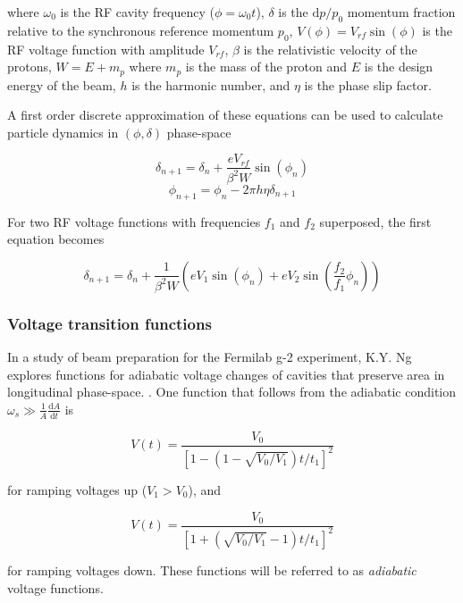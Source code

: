 where $\omega_0$ is the RF cavity frequency ($\phi = \omega_0 t$),
$\delta$ is the $\mathrm{d}p/p_0$ momentum fraction relative to the
synchronous reference momentum $p_0$, $V(\phi) = V_{rf}\sin(\phi)$ is
the RF voltage function with amplitude $V_{rf}$, $\beta$ is the
relativistic velocity of the protons, $W = E + m_p$ where $m_p$ is the
mass of the proton and $E$ is the design energy of the beam, $h$ is
the harmonic number, and $\eta$ is the phase slip factor.

A first order discrete approximation of these equations can be used to
calculate particle dynamics in $(\phi, \delta)$ phase-space

\begin{equation}
\delta_{n+1} = \delta_n +  \frac{e V_{rf}}{\beta ^2 W}\sin(\phi_n) 
\end{equation}
\begin{equation}
\phi_{n+1} = \phi_n - 2\pi h \eta \delta_{n+1} 
\end{equation}

For two RF voltage functions with frequencies $f_{1}$ and $f_{2}$
superposed, the first equation becomes

\begin{equation}
\delta_{n+1} = \delta_n +  \frac{1}{\beta ^2 W}(eV_{1}\sin(\phi_n) + eV_{2}\sin(\frac{f_2}{f_1}\phi_n)) 
\end{equation}

\subsubsection{Voltage transition functions}

In a study of beam preparation for the Fermilab g-2 experiment,
K.Y. Ng explores functions for adiabatic voltage changes of cavities
that preserve area in longitudinal
phase-space. \cite{adiabatic_capture}. One function that follows from
the adiabatic condition $\omega_s \gg \frac{1}{A} \frac{\mathrm{d}
  A}{\mathrm{d}t}$ is

\begin{equation}
V(t) = \frac{V_0}{[1 - (1 - \sqrt{V_0/V_1})t/t_1]^2}
\end{equation}

for ramping voltages up ($V_1 > V_0$), and 

\begin{equation}
V(t) = \frac{V_0}{[1 + (\sqrt{V_0/V_1} - 1)t/t_1]^2}
\end{equation}

for ramping voltages down. These functions will be referred to as
\textit{adiabatic} voltage functions.

